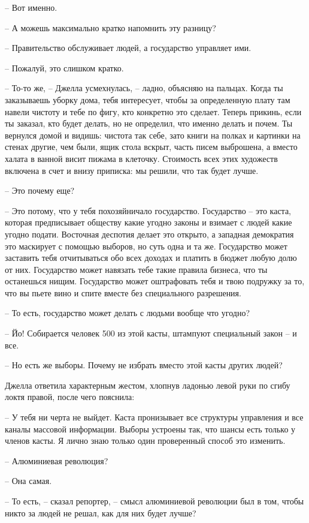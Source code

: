 -- Вот именно.

-- А можешь максимально кратко напомнить эту разницу?

-- Правительство обслуживает людей, а государство управляет ими.

-- Пожалуй, это слишком кратко.

-- То-то же, -- Джелла усмехнулась, -- ладно, объясняю на пальцах. Когда ты заказываешь уборку дома, тебя интересует, чтобы за определенную плату там навели чистоту и тебе по фигу, кто конкретно это сделает. Теперь прикинь, если ты заказал, кто будет делать, но не определил, что именно делать и почем. Ты вернулся домой и видишь: чистота так себе, зато книги на полках и картинки на стенах другие, чем были, ящик стола вскрыт, часть писем выброшена, а вместо халата в ванной висит пижама в клеточку. Стоимость всех этих художеств включена в счет и внизу приписка: мы решили, что так будет лучше.

-- Это почему еще?

-- Это потому, что у тебя похозяйничало государство. Государство -- это каста, которая предписывает обществу какие угодно законы и взимает с людей какие угодно подати. Восточная деспотия делает это открыто, а западная демократия это маскирует с помощью выборов, но суть одна и та же. Государство может заставить тебя отчитываться обо всех доходах и платить в бюджет любую долю от них. Государство может навязать тебе такие правила бизнеса, что ты останешься нищим. Государство может оштрафовать тебя и твою подружку за то, что вы пьете вино и спите вместе без специального разрешения.

-- То есть, государство может делать с людьми вообще что угодно?

-- Йо! Собирается человек 500 из этой касты, штампуют специальный закон -- и все.

-- Но есть же выборы. Почему не избрать вместо этой касты других людей?

Джелла ответила характерным жестом, хлопнув ладонью левой руки по сгибу локтя правой, после чего пояснила:

-- У тебя ни черта не выйдет. Каста пронизывает все структуры управления и все каналы массовой информации. Выборы устроены так, что шансы есть только у членов касты. Я лично знаю только один проверенный способ это изменить.

-- Алюминиевая революция?

-- Она самая.

-- То есть, -- сказал репортер, -- смысл алюминиевой революции был в том, чтобы никто за людей не решал, как для них будет лучше?

